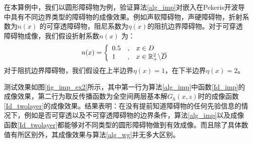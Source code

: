 \begin{example}[不同边界类型]\label{imp_ex2}
在本算例中，我们以圆形障碍物为例，验证算法\ref{alg_imp}对嵌入在Pekeris开波导中具有不同边界类型的障碍物的成像效果。例如声软障碍物，声硬障碍物，折射系数为$n(x)$ 的可穿透障碍物，阻尼系数为$\eta(x)$的阻抗边界障碍物。对于可穿透障碍物成像，我们假设折射系数$n(x)$ 为：
\begin{eqnarray*}
n(x)=\left\{
\begin{array}{lll}
  0.5&,&x\in D\\
  1&,&x\in\mathbb{R}_+^2\backslash\overline D
\end{array}
\right.
\end{eqnarray*}
对于阻抗边界障碍物，我们假设在上半边界$\eta(x)=1$，在下半边界$\eta(x)=2$。

测试效果如图\ref{fig_imp_ex2}所示，其中第一行为算法\ref{alg_imp}中函数\ref{Id_imp}的成像效果，第二行为取反传播函数为全空间两层基本解$G_h(x,z)$时的成像函数\ref{Id_twolayer}的成像效果。结果表明：在没有提前知道障碍物的任何先验信息的情况下，例如是否可穿透以及不可穿透障碍物的边界条件，算法\ref{alg_imp}以及成像函数\ref{Id_twolayer}都能够对不同类型的圆形障碍物做到有效成像。而且除了具体数值有所区别外，其成像效果与算法\ref{alg_wg}并无多大区别。
\end{example}

